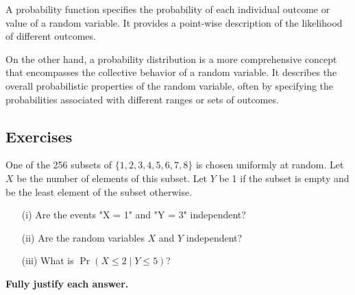 A probability function specifies the probability of each individual outcome or value of a random variable. It provides a point-wise description of the likelihood of different outcomes.

On the other hand, a probability distribution is a more comprehensive concept that encompasses the collective behavior of a random variable. It describes the overall probabilistic properties of the random variable, often by specifying the probabilities associated with different ranges or sets of outcomes.
\subsection{Exercises}



\begin{exercise}
One of the 256 subsets of $\{1,2,3,4,5,6,7,8\}$ is chosen uniformly at random. Let $X$ be the number of elements of this subset. Let $Y$ be 1 if the subset is empty and be the least element of the subset otherwise.

\begin{enumerate}
    \item[(i)] Are the events "X = 1" and "Y = 3" independent?
    \item[(ii)] Are the random variables $X$ and $Y$ independent?
    \item[(iii)] What is $\Pr(X \leq 2 \mid Y \leq 5)$?
\end{enumerate}

\textbf{Fully justify each answer.}
\end{exercise}

